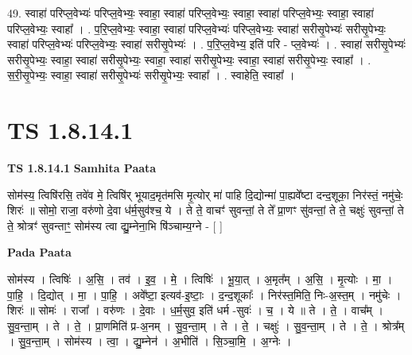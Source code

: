\documentclass[17pt]{extarticle}
\begin{document}
49. स्वाहा॑ परिप्ल॒वेभ्यः॑ परिप्ल॒वेभ्यः॒ स्वाहा॒ स्वाहा॑ परिप्ल॒वेभ्यः॒ स्वाहा॒ स्वाहा॑ परिप्ल॒वेभ्यः॒ स्वाहा॒ स्वाहा॑ परिप्ल॒वेभ्यः॒ स्वाहा᳚ । . प॒रि॒प्ल॒वेभ्यः॒ स्वाहा॒ स्वाहा॑ परिप्ल॒वेभ्यः॑ परिप्ल॒वेभ्यः॒ स्वाहा॑ सरीसृ॒पेभ्यः॑ सरीसृ॒पेभ्यः॒ स्वाहा॑ परिप्ल॒वेभ्यः॑ परिप्ल॒वेभ्यः॒ स्वाहा॑ सरीसृ॒पेभ्यः॑ । . प॒रि॒प्ल॒वेभ्य॒ इति॑ परि - प्ल॒वेभ्यः॑ । . स्वाहा॑ सरीसृ॒पेभ्यः॑ सरीसृ॒पेभ्यः॒ स्वाहा॒ स्वाहा॑ सरीसृ॒पेभ्यः॒ स्वाहा॒ स्वाहा॑ सरीसृ॒पेभ्यः॒ स्वाहा॒ स्वाहा॑ सरीसृ॒पेभ्यः॒ स्वाहा᳚ । . स॒री॒सृ॒पेभ्यः॒ स्वाहा॒ स्वाहा॑ सरीसृ॒पेभ्यः॑ सरीसृ॒पेभ्यः॒ स्वाहा᳚ । . स्वाहेति॒ स्वाहा᳚ । \newline
\pagebreak
{}
\section*{ TS 1.8.14.1 }

\textbf{TS 1.8.14.1 } \newline
\textbf{Samhita Paata} \newline

सोम॑स्य॒ त्विषि॑रसि॒ तवे॑व मे॒ त्विषि॑र् भूयाद॒मृत॑मसि मृ॒त्योर् मा॑ पाहि दि॒द्योन्मा॑ पा॒ह्यवे᳚ष्टा दन्द॒शूका॒ निर॑स्तं॒ नमु॑चेः॒ शिरः॑ ॥ सोमो॒ राजा॒ वरु॑णो दे॒वा ध॑र्म॒सुव॑श्च॒ ये । ते ते॒ वाचꣳ॑ सुवन्तां॒ ते ते᳚ प्रा॒णꣳ सु॑वन्तां॒ ते ते॒ चक्षुः॑ सुवन्तां॒ ते ते॒ श्रोत्रꣳ॑ सुवन्ताꣳ॒॒ सोम॑स्य त्वा द्यु॒म्नेना॒भि षि॑ञ्चाम्य॒ग्ने - [ ] \newline

\textbf{Pada Paata} \newline

सोम॑स्य । त्विषिः॑ । अ॒सि॒ । तव॑ । इ॒व॒ । मे॒ । त्विषिः॑ । भू॒या॒त् । अ॒मृत᳚म् । अ॒सि॒ । मृ॒त्योः । मा॒ । पा॒हि॒ । दि॒द्योत् । मा॒ । पा॒हि॒ । अवे᳚ष्टा॒ इत्यव॑-इ॒ष्टाः॒ । द॒न्द॒शूकाः᳚ । निर॑स्त॒मिति॒ निः-अ॒स्त॒म् । नमु॑चेः । शिरः॑ ॥ सोमः॑ । राजा᳚ । वरु॑णः । दे॒वाः । ध॒र्म॒सुव॒ इति॑ धर्म -सुवः॑ । च॒ । ये ॥ ते । ते॒ । वाच᳚म् । सु॒व॒न्ता॒म् । ते । ते॒ । प्रा॒णमिति॑ प्र-अ॒नम् । सु॒व॒न्ता॒म् । ते । ते॒ । चक्षुः॑ । सु॒व॒न्ता॒म् । ते । ते॒ । श्रोत्र᳚म् । सु॒व॒न्ता॒म् । सोम॑स्य । त्वा॒ । द्यु॒म्नेन॑ । अ॒भीति॑ । सि॒ञ्चा॒मि॒ । अ॒ग्नेः ।  \newline
\end{document}
